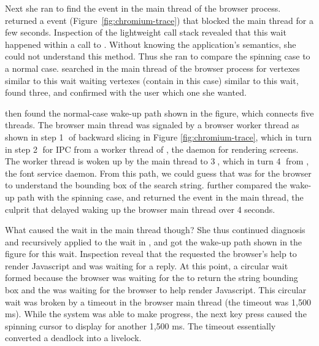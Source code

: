 
Next she ran \xxx to find the event in the main thread of the browser process.
\xxx returned a  event (Figure~\ref{fig:chromium-trace})
that blocked the main thread for a few seconds.  Inspection of the lightweight
call stack revealed that this wait happened within a call to
.  Without knowing the
application's semantics, she could not understand this method.  Thus she ran
\xxx to compare the spinning case to a normal case.  \xxx searched in the main
thread of the browser process for vertexes similar to this wait waiting
vertexes (contain  in this case) similar to
this wait, found three, and confirmed with the user which one she wanted.

\xxx then found the normal-case wake-up path shown in the figure, which
connects five threads.  The browser main thread was signaled by a browser
worker thread as shown in step \textcircled{1} of backward slicing in Figure
\ref{fig:chromium-trace}, which in turn  in step \textcircled{2}
for IPC from a worker thread of , the daemon for rendering screens.
The  worker thread is woken up by the  main thread to
 \textcircled{3}, which in turn  \textcircled{4}
from , the font service daemon.  From this path, we could guess that
 was for the browser to understand the bounding box of
the search string.  \xxx further compared the wake-up path with the spinning
case, and returned the  event in the  main
thread, the culprit that delayed waking up the browser main thread over 4
seconds.

What caused the wait in the  main thread though?  She thus
continued diagnosis and recursively applied \xxx to the wait in ,
and got the wake-up path shown in the figure for this wait.  Inspection reveal
that the  requested the browser's help to render Javascript and was
waiting for a reply.  At this point, a circular wait formed because the browser
was waiting for the  to return the string bounding box and the
 was waiting for the browser to help render Javascript.  This
circular wait was broken by a timeout in the browser main thread (the
 timeout was 1,500 ms).  While the system was able to make
progress, the next key press caused the spinning cursor to display for another
1,500 ms.  The timeout essentially converted a deadlock into a livelock.

